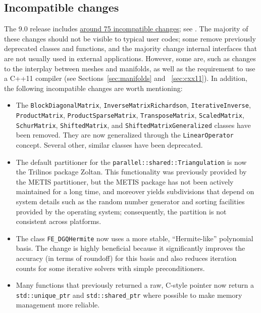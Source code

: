 \documentclass{ansarticle-preprint}
\begin{document}
\subsection{Incompatible changes}

The 9.0 release includes
\href{https://www.dealii.org/developer/doxygen/deal.II/changes_between_8_5_and_9_0.html}
     {around 75 incompatible changes}; see \cite{changes90}. The majority of these changes
should not be visible to typical user codes; some remove previously
deprecated classes and functions, and the majority change internal
interfaces that are not usually used in external
applications. However, some are, such as changes to the interplay between meshes and
manifolds, as well as the requirement to use a
C++11 compiler (see Sections~\ref{sec:manifolds} and
~\ref{sec:cxx11}). In addition, the following
incompatible changes are worth mentioning:
\begin{itemize}
\item The \texttt{BlockDiagonalMatrix},
  \texttt{InverseMatrixRichardson},
  \texttt{IterativeInverse},
  \texttt{ProductMatrix},
  \texttt{ProductSparseMatrix},
  \texttt{TransposeMatrix},
  \texttt{ScaledMatrix},
  \texttt{SchurMatrix},
  \texttt{ShiftedMatrix}, and
  \texttt{ShiftedMatrixGeneralized} classes have been removed. They are now
  generalized through the \texttt{LinearOperator} concept. Several
  other, similar classes have been deprecated.

  \item The default partitioner for the
    \texttt{parallel::shared::Triangulation} is now the Trilinos
    package Zoltan. This functionality was previously provided by the
    METIS partitioner, but the METIS package has not been actively maintained
    for a long time, and moreover yields subdivisions that depend on
    system details such as the random number generator and sorting
    facilities provided by the operating system; consequently, the
    partition is not consistent across platforms.

  \item  The class \texttt{FE\_DGQHermite}  now uses a more stable,
    ``Hermite-like'' polynomial basis. The change is highly
    beneficial because it significantly improves the accuracy (in
    terms of roundoff) for this basis and also reduces iteration
    counts for some iterative solvers with simple preconditioners.

  \item Many functions that previously returned a raw, C-style pointer
    now return a \texttt{std::unique\_ptr} and
    \texttt{std::shared\_ptr} where possible to make memory management
    more reliable.
\end{itemize}
\end{document}
